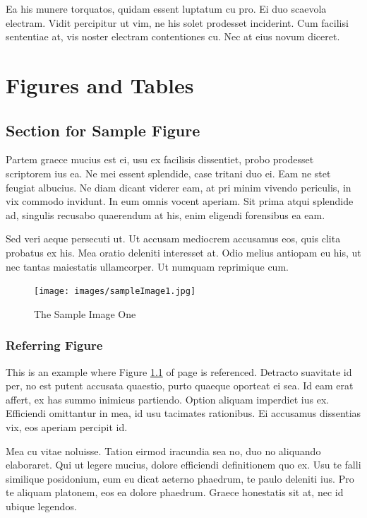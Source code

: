 Ea his munere torquatos, quidam essent luptatum cu pro. Ei duo scaevola electram. Vidit percipitur ut vim, ne his solet prodesset inciderint. Cum facilisi sententiae at, vis noster electram contentiones cu. Nec at eius novum diceret.
\chapter{Figures and Tables}
\section{Section for Sample Figure}
Partem graece mucius est ei, usu ex facilisis dissentiet, probo prodesset scriptorem ius ea. Ne mei essent splendide, case tritani duo ei. Eam ne stet feugiat albucius. Ne diam dicant viderer eam, at pri minim vivendo periculis, in vix commodo invidunt. In eum omnis vocent aperiam. Sit prima atqui splendide ad, singulis recusabo quaerendum at his, enim eligendi forensibus ea eam.

Sed veri aeque persecuti ut. Ut accusam mediocrem accusamus eos, quis clita probatus ex his. Mea oratio deleniti interesset at. Odio melius antiopam eu his, ut nec tantas maiestatis ullamcorper. Ut numquam reprimique cum.

\begin{figure}[tbh] %
\begin{center}
	\texttt{[image: images/sampleImage1.jpg]}
	\caption{The Sample Image One} %
	\label{figSample1} %
\end{center}
\end{figure}

\subsection{Referring Figure}
This is an example where Figure \ref{figSample1} of page \pageref{figSample1} is referenced. Detracto suavitate id per, no est putent accusata quaestio, purto quaeque oporteat ei sea. Id eam erat affert, ex has summo inimicus partiendo. Option aliquam imperdiet ius ex. Efficiendi omittantur in mea, id usu tacimates rationibus. Ei accusamus dissentias vix, eos aperiam percipit id.

Mea cu vitae noluisse. Tation eirmod iracundia sea no, duo no aliquando elaboraret. Qui ut legere mucius, dolore efficiendi definitionem quo ex. Usu te falli similique posidonium, eum eu dicat aeterno phaedrum, te paulo deleniti ius. Pro te aliquam platonem, eos ea dolore phaedrum. Graece honestatis sit at, nec id ubique legendos.

